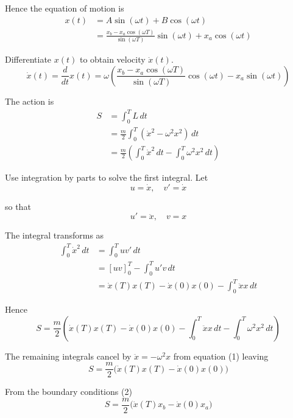 Hence the equation of motion is
\begin{align*}
x(t)&=A\sin(\omega t)+B\cos(\omega t)
\\
&=\frac{x_b-x_a\cos(\omega T)}{\sin(\omega T)}\sin(\omega t)+x_a\cos(\omega t)
\tag{3}
\end{align*}

Differentiate $x(t)$ to obtain velocity $\dot x(t)$.
\begin{equation*}
\dot x(t)=\frac{d}{dt}x(t)=
\omega\left(
\frac{x_b-x_a\cos(\omega T)}{\sin(\omega T)}\cos(\omega t)-x_a\sin(\omega t)
\right)
\tag{4}
\end{equation*}

The action is
\begin{align*}
S&=\int_0^TL\,dt
\\
&=\frac{m}{2}\int_0^T (\dot{x}^2-\omega^2 x^2)\,dt
\\
&=\frac{m}{2}\left(
\int_0^T\dot{x}^2\,dt
-\int_0^T\omega^2x^2\,dt
\right)
\end{align*}

Use integration by parts to solve the first integral.
Let
\begin{equation*}
u=\dot x,\quad v'=\dot x
\end{equation*}

so that
\begin{equation*}
u'=\ddot x,\quad v=x
\end{equation*}

The integral transforms as
\begin{align*}
\int_0^T \dot x^2\,dt
&=\int_0^T uv'\,dt
\\
&=[uv]_0^T
-\int_0^Tu'v\,dt
\\
&=\dot x(T)x(T)-\dot x(0)x(0)-\int_0^T\ddot xx\,dt
\end{align*}

Hence
\begin{equation*}
S=\frac{m}{2}\left(
\dot x(T)x(T)-\dot x(0)x(0)
-\int_0^T \ddot xx\,dt
-\int_0^T\omega^2x^2\,dt
\right)
\end{equation*}

The remaining integrals cancel by $\ddot x=-\omega^2x$ from equation (1) leaving
\begin{equation*}
S=\frac{m}{2}\bigl(\dot x(T)x(T)-\dot x(0)x(0)\bigr)
\tag{5}
\end{equation*}

From the boundary conditions (2)
\begin{equation*}
S=\frac{m}{2}\bigl(\dot x(T)x_b-\dot x(0)x_a\bigr)
\end{equation*}

